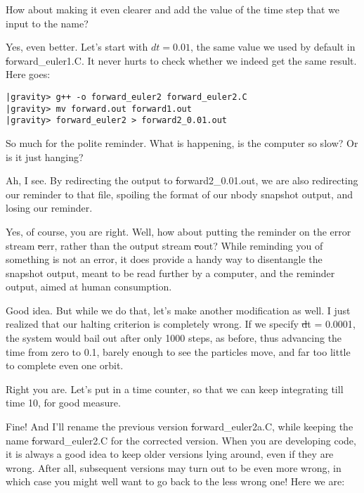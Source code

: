 \bob
How about making it even clearer and add the value of the time step
that we input to the name?

\carol
Yes, even better.  Let's start with $dt = 0.01$, the same value we
used by default in {\st forward\_euler1.C}.  It never hurts to check
whether we indeed get the same result.  Here goes:

\begin{small}
\begin{verbatim}
|gravity> g++ -o forward_euler2 forward_euler2.C
|gravity> mv forward.out forward1.out
|gravity> forward_euler2 > forward2_0.01.out
\end{verbatim}
\end{small}

\bob
So much for the polite reminder.  What is happening, is the computer
so slow?  Or is it just hanging?

\alice
Ah, I see.  By redirecting the output to {\st forward2\_0.01.out}, we are
also redirecting our reminder to that file, spoiling the format of our
nbody snapshot output, and losing our reminder.

\carol
Yes, of course, you are right.  Well, how about putting the reminder
on the error stream {\st cerr}, rather than the output stream {\st
cout}?  While reminding you of something is not an error, it does
provide a handy way to disentangle the snapshot output, meant to be
read further by a computer, and the reminder output, aimed at human
consumption.

\bob
Good idea.  But while we do that, let's make another modification as
well.  I just realized that our halting criterion is completely wrong.
If we specify {\st dt = 0.0001}, the system would bail out after only
1000 steps, as before, thus advancing the time from zero to 0.1, barely
enough to see the particles move, and far too little to complete even
one orbit.

\alice
Right you are.  Let's put in a time counter, so that we can keep
integrating till time 10, for good measure.

\carol
Fine!  And I'll rename the previous version {\st forward\_euler2a.C},
while keeping the name {\st forward\_euler2.C} for the corrected version.
When you are developing code, it is always a good idea to keep older
versions lying around, even if they are wrong.  After all, subsequent
versions may turn out to be even more wrong, in which case you might
well want to go back to the less wrong one!  Here we are:

\cba

